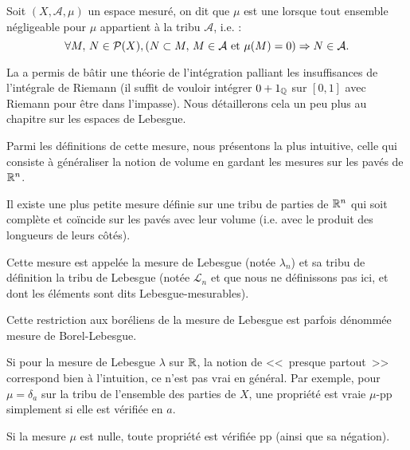 \begin{definition}
Soit $(X,\mathcal{A},\mu)$ un espace mesuré,
on dit que $\mu$ est une 
lorsque tout ensemble négligeable pour $\mu$ appartient à la tribu $\mathcal{A}$, i.e. :
\begin{equation}
\forall M,\, N\in\mathcal{P}(X), \left(N\subset M,\, M\in\mathcal{A}\hbox{ et }\mu(M)=0\right)\Rightarrow N\in\mathcal{A}.
\end{equation}
\end{definition}

La 
a permis de bâtir une théorie de
l'intégration palliant les insuffisances de l'intégrale de Riemann (il suffit de vouloir
intégrer $0+1_{\mathbb Q}$ sur $[0,1]$ avec Riemann pour être dans l'impasse).
Nous détaillerons cela un peu plus au chapitre sur les espaces de Lebesgue.\label{Sec-impasse}

Parmi les définitions de cette mesure, nous présentons la plus intuitive, celle
qui consiste à généraliser la notion de volume en gardant les mesures sur
les pavés de $\mathbb R^n$.

\begin{definition}
Il existe une plus petite mesure définie sur une tribu de parties de $\mathbb R^n$ qui soit
complète et coïncide sur les pavés avec leur volume (i.e. avec le produit des longueurs de leurs côtés).

Cette mesure est appelée la mesure de Lebesgue (notée $\lambda_n$) et sa tribu de définition
la tribu de Lebesgue (notée  $\mathcal L_n$ et que nous ne définissons pas ici, et dont les éléments
sont dits Lebesgue-mesurables).
\end{definition}

Cette restriction aux boréliens de la mesure de Lebesgue est parfois dénommée mesure de Borel-Lebesgue.

Si pour la mesure de Lebesgue $\lambda$ sur $\mathbb R$, la notion de <<~presque partout~>> correspond bien
à l'intuition, ce n'est pas vrai en général.
Par exemple, pour $\mu=\delta_a$ sur la tribu de l'ensemble des parties de $X$, une propriété
est vraie $\mu$-pp simplement si elle est vérifiée en $a$.

Si la mesure $\mu$ est nulle, toute propriété est vérifiée pp (ainsi que sa négation).

